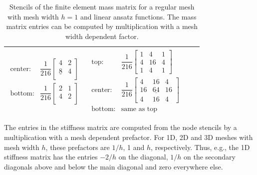 \begin{table}
\begin{tabular}{|c|c|c|c}
\begin{minipage}{6cm}
\begin{equation*}
\begin{array}{ll}
        \text{center:} &
        \dfrac1{216}\left[\begin{array}{ccc}
            4 & 2\\
            \underline{8} & 4\\
        \end{array}\right] \\[4mm]
        \text{bottom:}& 
        \dfrac1{216}\left[\begin{array}{ccc}
            2 & 1\\
            4 & 2\\
        \end{array}\right]
      \end{array}
    \end{equation*}
  \end{minipage} &
  \begin{minipage}{6cm}
    \begin{equation*}
      \begin{array}{ll}
        \text{top:} &
        \dfrac1{216}\left[\begin{array}{ccc}
            1 & 4 & 1\\
            4 & 16 & 4\\
            1 & 4 & 1
        \end{array}\right] \\[4mm]
        \text{center:} &
        \dfrac1{216}\left[\begin{array}{ccc}
            4 & 16 & 4\\
            16 & \underline{64} & 16\\
            4 & 16 & 4
        \end{array}\right] \\[4mm]
        \text{bottom:}& \text{same as top}
      \end{array}  
    \end{equation*}
  \end{minipage}
  \\\hline
  \end{tabular}
  \caption{Stencils of the finite element mass matrix for a regular mesh with mesh width $h=1$ and linear ansatz functions. The mass matrix entries can be computed by multiplication with a mesh width dependent factor.}
  \label{tab:stencils_mass_laplace}
\end{table}

The entries in the stiffness matrix are computed from the node stencils by a multiplication with a mesh dependent prefactor.
For 1D, 2D and 3D meshes with mesh width $h$, these prefactors are $1/h$, 1 and $h$, respectively. Thus, e.g., the 1D stiffness matrix has the entries $-2/h$ on the diagonal, $1/h$ on the secondary diagonals above and below the main diagonal and zero everywhere else.

